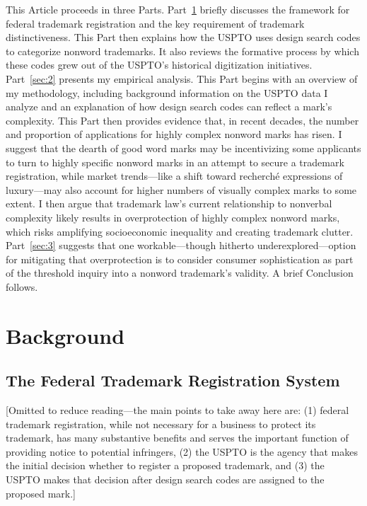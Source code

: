 \documentclass[letterpaper, 11pt, oneside]{article}
\begin{document}
This Article proceeds in three Parts. Part~\ref{sec:1} briefly discusses the framework for federal trademark registration and the key requirement of trademark distinctiveness. This Part then explains how the USPTO uses design search codes to categorize nonword trademarks. It also reviews the formative process by which these codes grew out of the USPTO's historical digitization initiatives. Part~\ref{sec:2} presents my empirical analysis. This Part begins with an overview of my methodology, including background information on the USPTO data I analyze and an explanation of how design search codes can reflect a mark's complexity. This Part then provides evidence that, in recent decades, the number and proportion of applications for highly complex nonword marks has risen. I suggest that the dearth of good word marks may be incentivizing some applicants to turn to highly specific nonword marks in an attempt to secure a trademark registration, while market trends—like a shift toward recherché expressions of luxury—may also account for higher numbers of visually complex marks to some extent. I then argue that trademark law's current relationship to nonverbal complexity likely results in overprotection of highly complex nonword marks, which risks amplifying socioeconomic inequality and creating trademark clutter. Part~\ref{sec:3} suggests that one workable—though hitherto underexplored—option for mitigating that overprotection is to consider consumer sophistication as part of the threshold inquiry into a nonword trademark's validity. A brief Conclusion follows.

\section{Background}\label{sec:1}

\subsection{The Federal Trademark Registration System}\label{subsec:1A}

[Omitted to reduce reading—the main points to take away here are: (1) federal trademark registration, while not necessary for a business to protect its trademark, has many substantive benefits and serves the important function of providing notice to potential infringers, (2) the USPTO is the agency that makes the initial decision whether to register a proposed trademark, and (3) the USPTO makes that decision after design search codes are assigned to the proposed mark.]  
\end{document}
